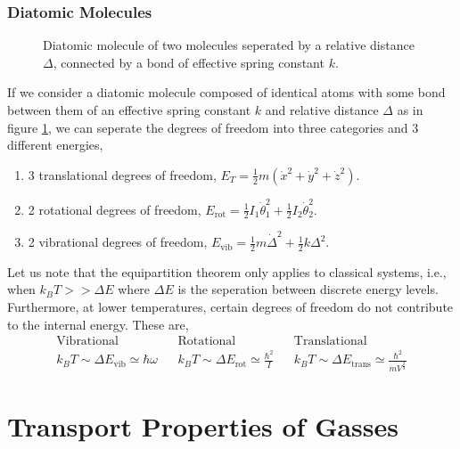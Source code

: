 \documentclass{book}
\begin{document}
\subsection{Diatomic Molecules}
\begin{figure}[b]
	\centering
{}
\caption{Diatomic molecule of two molecules seperated by a relative distance $\Delta$, connected by a bond of effective spring constant $k$.}
\label{fig:diatomic}
\end{figure}
If we consider a diatomic molecule composed of identical atoms with some bond between them of an effective spring constant $k$ and relative distance $\Delta$ as in figure \ref{fig:diatomic}, we can seperate the degrees of freedom into three categories and 3 different energies,
\begin{enumerate}
	\item 3 translational degrees of freedom, $E_T = \frac{1}{2}m\left(\Dot{x}^2 + \Dot{y}^2 + \Dot{z}^2\right)$.
	\item 2 rotational degrees of freedom, $E_{\text{rot}} = \frac{1}{2} I_1\Dot{\theta}_1^2 + \frac{1}{2}I_2\Dot{\theta}_2^2$.
	\item 2 vibrational degrees of freedom, $E_{\text{vib}} = \frac{1}{2}m\Dot{\Delta}^2 + \frac{1}{2}k\Delta^2$.
\end{enumerate}
Let us note that the equipartition theorem only applies to classical systems, i.e., when $k_B T >> \Delta E$ where $\Delta E$ is the seperation between discrete energy levels. Furthermore, at lower temperatures, certain degrees of freedom do not contribute to the internal energy. These are,
\begin{align}
	\text{Vibrational} && \text{Rotational} && \text{Translational} \\
	k_BT \sim \Delta E_{\text{vib}} \simeq \hbar \omega && k_BT \sim \Delta E_{\text{rot}} \simeq \frac{\hbar^2}{I} && k_BT \sim \Delta E_{\text{trans}} \simeq \frac{\hbar^2}{mV^{\frac{2}{3}}}
\end{align}
\chapter{Transport Properties of Gasses}
\end{document}
